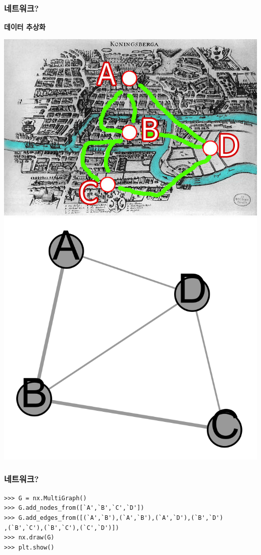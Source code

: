 \documentclass{beamer}
\begin{document}
\begin{frame}
\frametitle{네트워크?}
\textbf{데이터 추상화}\\
\begin{center}
\includegraphics[scale=0.3]{Koenigsberg_symbol.jpg}\includegraphics[scale=0.3]{Koenigsberg.png}
\end{center}
\end{frame}

\begin{frame}[fragile]
\frametitle{네트워크?}
\begin{verbatim}
>>> G = nx.MultiGraph()
>>> G.add_nodes_from([`A',`B',`C',`D'])
>>> G.add_edges_from([(`A',`B'),(`A',`B'),(`A',`D'),(`B',`D')
,(`B',`C'),(`B',`C'),(`C',`D')])
>>> nx.draw(G)
>>> plt.show()
\end{verbatim}
\end{frame}
\end{document}
